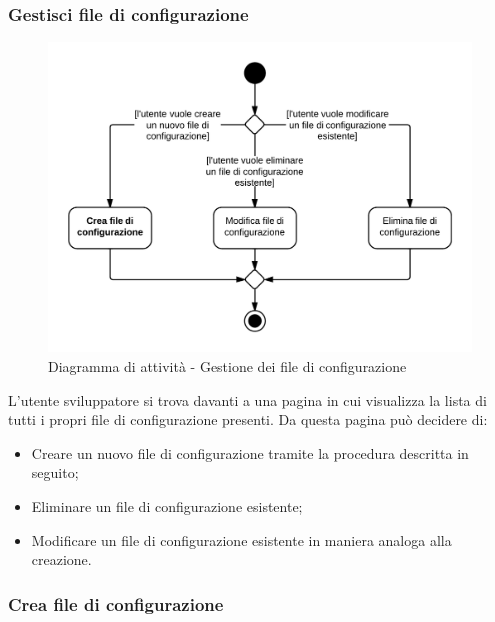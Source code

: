\subsubsection{Gestisci file di configurazione}

\begin{figure}[H]
\centering
\includegraphics[scale=0.2]{uml/MaaS - Gestisci file di configurazione.png}
\caption{Diagramma di attività - Gestione dei file di configurazione}
\end{figure}

L'utente sviluppatore si trova davanti a una pagina in cui visualizza la lista di tutti i propri file di configurazione presenti. Da questa pagina può decidere di:

\begin{itemize}

	\item Creare un nuovo file di configurazione tramite la procedura descritta in seguito;
	\item Eliminare un file di configurazione esistente;
	\item Modificare un file di configurazione esistente in maniera analoga alla creazione.

\end{itemize}

\subsubsection{Crea file di configurazione}

